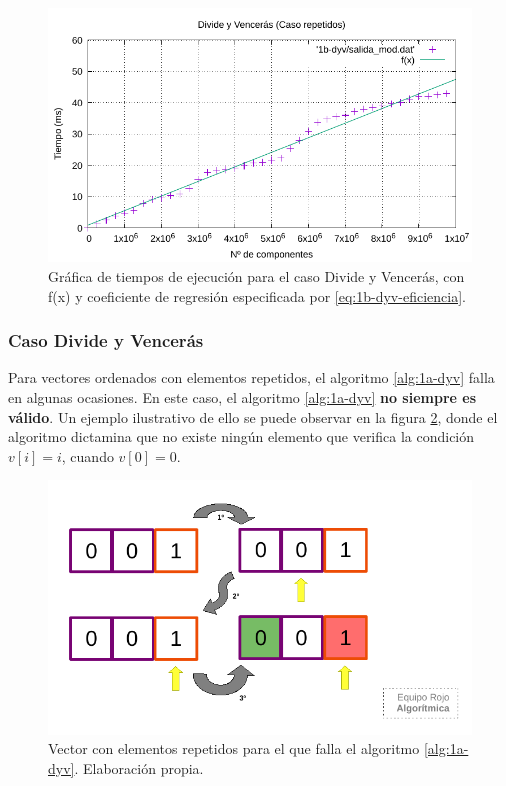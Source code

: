 \begin{figure}
    \centering
    \includegraphics[scale=0.76]{img/e1b-dyv}
    \caption{Gráfica de tiempos de ejecución para el caso Divide y Vencerás, 
    con f(x) y coeficiente de regresión especificada por \ref{eq:1b-dyv-eficiencia}.}
    \label{fig:1b-obvio-graph}
\end{figure}


\subsubsection{Caso Divide y Vencerás}

Para vectores ordenados con elementos repetidos, el algoritmo \ref{alg:1a-dyv} falla en algunas ocasiones. En este caso, 
el algoritmo \ref{alg:1a-dyv} 
\textbf{no siempre es válido}. Un ejemplo ilustrativo de ello se
puede observar en la figura \ref{fig:fallo-1a}, donde el algoritmo dictamina que no existe ningún
elemento que verifica la condición $v[i] = i$, cuando $v[0] = 0$. 

\begin{figure}
    \centering
    \includegraphics{img/esquema_fallo1a.pdf}
    \caption{Vector con elementos repetidos para el que falla 
    el algoritmo \ref{alg:1a-dyv}. Elaboración propia.}
    \label{fig:fallo-1a}
\end{figure}

